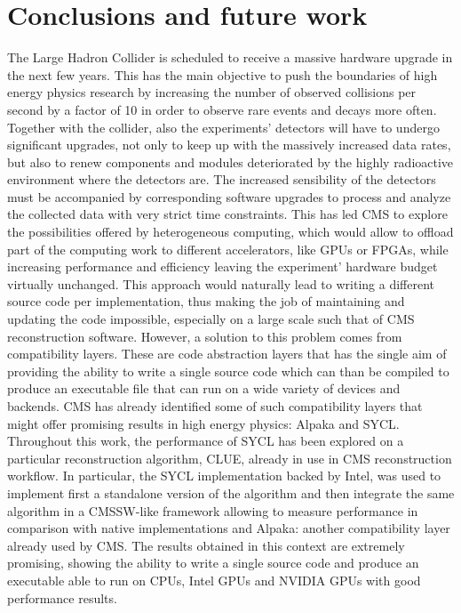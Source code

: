 \chapter*{Conclusions and future work}
The Large Hadron Collider is scheduled to receive a massive hardware upgrade in the next few years. This has the main objective to push the boundaries of high energy physics research by increasing the number of observed collisions per second by a factor of 10 in order to observe rare events and decays more often. Together with the collider, also the experiments' detectors will have to undergo significant upgrades, not only to keep up with the massively increased data rates, but also to renew components and modules deteriorated by the highly radioactive environment where the detectors are. The increased sensibility of the detectors must be accompanied by corresponding software upgrades to process and analyze the collected data with very strict time constraints. This has led CMS to explore the possibilities offered by heterogeneous computing, which would allow to offload part of the computing work to different accelerators, like GPUs or FPGAs, while increasing performance and efficiency leaving the experiment' hardware budget virtually unchanged. This approach would naturally lead to writing a different source code per implementation, thus making the job of maintaining and updating the code impossible, especially on a large scale such that of CMS reconstruction software. However, a solution to this problem comes from compatibility layers. These are code abstraction layers that has the single aim of providing the ability to write a single source code which can than be compiled to produce an executable file that can run on a wide variety of devices and backends. CMS has already identified some of such compatibility layers that might offer promising results in high energy physics: Alpaka and SYCL. Throughout this work, the performance of SYCL has been explored on a particular reconstruction algorithm, CLUE, already in use in CMS reconstruction workflow. In particular, the SYCL implementation backed by Intel, was used to implement first a standalone version of the algorithm and then integrate the same algorithm in a CMSSW-like framework allowing to measure performance in comparison with native implementations and Alpaka: another compatibility layer already used by CMS. The results obtained in this context are extremely promising, showing the ability to write a single source code and produce an executable able to run on CPUs, Intel GPUs and NVIDIA GPUs with good performance results. 

